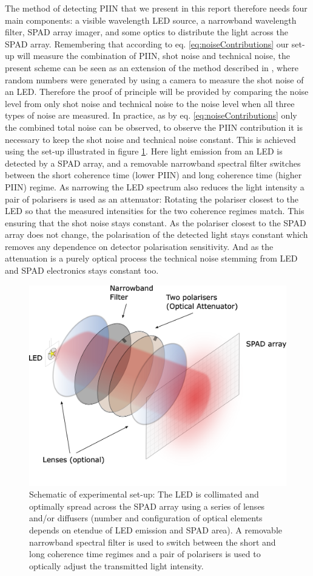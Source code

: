 \documentclass[]{article}
\begin{document}
	The method of detecting PIIN that we present in this report therefore needs four main components: a visible wavelength LED source, a narrowband wavelength filter, SPAD array imager, and some optics to distribute the light across the SPAD array. Remembering that according to eq. \ref{eq:noiseContributions} our set-up will measure the combination of PIIN, shot noise and technical noise, the present scheme can be seen as an extension of the method described in \cite{sanguinetti_quantum_2014}, where random numbers were generated by using a camera to measure the shot noise of an LED. Therefore the proof of principle will be provided by comparing the noise level from only shot noise and technical noise to the noise level when all three types of noise are measured. In practice, as by eq. \ref{eq:noiseContributions} only the combined total noise can be observed, to observe the PIIN contribution it is necessary to keep the shot noise and technical noise constant. This is achieved using the set-up illustrated in figure \ref{fig:ledsetup1v2}. Here light emission from an LED is detected by a SPAD array, and a removable narrowband spectral filter switches between the short coherence time (lower PIIN) and long coherence time (higher PIIN) regime. As narrowing the LED spectrum also reduces the light intensity a pair of polarisers is used as an attenuator: Rotating the polariser closest to the LED so that the measured intensities for the two coherence regimes match. This ensuring that the shot noise stays constant. As the polariser closest to the SPAD array does not change, the polarisation of the detected light stays constant which removes any dependence on detector polarisation sensitivity. And as the attenuation is a purely optical process the technical noise stemming from LED and SPAD electronics stays constant too.
		\begin{figure}
		\centering
		\includegraphics[width=0.7\linewidth]{Figures/LED_setup1_v2}
		\caption{Schematic of experimental set-up: The LED is collimated and optimally spread across the SPAD array using a series of lenses and/or diffusers (number and configuration of optical elements depends on etendue of LED emission and SPAD area). A removable narrowband spectral filter is used to switch between the short and long coherence time regimes and a pair of polarisers is used to optically adjust the transmitted light intensity.}
		\label{fig:ledsetup1v2}
		\end{figure}
\end{document}

